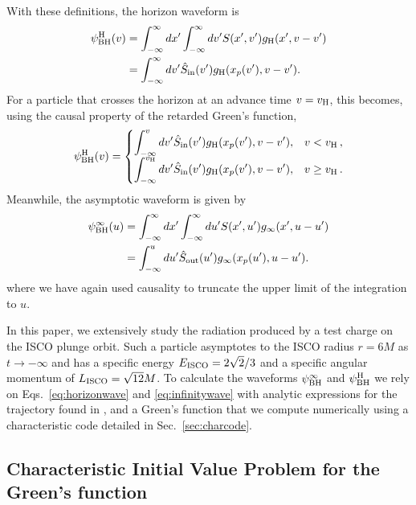 \begin{refsection}
With these definitions, the horizon waveform is
\begin{align}
\psi_{\rm BH}^{\rm H}(v) & =
\int_{-\infty}^\infty dx'\int_{-\infty}^\infty dv' S(x',v')g_{\rm H}(x',v-v') \nonumber \\
& = \int_{-\infty}^\infty dv'\hat S_{\rm in}(v')g_{\rm H}(x_p(v'),v-v'). \label{eq:horizonwave1}
\end{align}
For a particle that crosses the horizon at an advance time $v =v_{\rm H}$, this becomes, using the causal property of the retarded Green's function,
\begin{align}
\psi^{\rm H}_{\rm BH}(v)=\begin{cases}
\displaystyle
\int_{-\infty}^v dv'\hat S_{\rm in} (v')g_{\rm H}(x_p(v'),v-v'), & v< v_{\rm H}  \,, \\
\displaystyle
\int_{-\infty}^{v_{\rm H}} dv'\hat S_{\rm in} (v')g_{\rm H}(x_p(v'),v-v'), & v\geq v_{\rm H} \,. \label{eq:horizonwave}
\end{cases}
\end{align}
Meanwhile, the asymptotic waveform is given by
\begin{align}
\psi_{\rm BH}^{\infty}(u)& =
\int_{-\infty}^\infty dx'\int_{-\infty}^\infty du' S(x',u')g_{\infty}(x',u-u')
\nonumber \\
&=
\int_{-\infty}^u du'\hat S_{\rm out}(u')g_{\infty}(x_p(u'),u-u'). \label{eq:infinitywave}
\end{align}
where we have again used causality to truncate the upper limit of the integration to $u$.

In this paper, we extensively study the radiation produced by a test charge on the ISCO plunge orbit. Such a particle asymptotes to the ISCO radius $r=6M$ as $t\to - \infty$ and has a specific energy $E_{\rm ISCO}=2\sqrt{2}/3$ and a specific angular momentum of $L_{\rm ISCO}=\sqrt{12}M$. 
To calculate the waveforms $\psi_{\rm BH}^\infty$ and $\psi_{\rm BH}^{\rm H}$ we rely on Eqs.~\eqref{eq:horizonwave} and \eqref{eq:infinitywave} with analytic expressions for the trajectory found in \cite{Hadar:2009ip}, and a Green's function that we compute numerically using a characteristic code detailed in Sec.~\ref{sec:charcode}.

\subsection{Characteristic Initial Value Problem for the Green's function}


\end{refsection}
